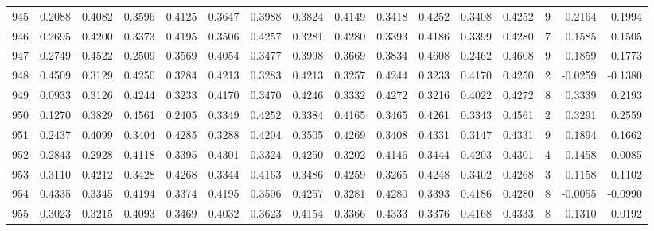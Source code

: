 \begin{tabular}{lrrrrrrrrrrrrrrr}
945 &      0.2088 &  0.4082 &  0.3596 &  0.4125 &  0.3647 &  0.3988 &  0.3824 &  0.4149 &  0.3418 &  0.4252 &   0.3408 &     0.4252 &      9 &                    0.2164 &                     0.1994 \\
946 &      0.2695 &  0.4200 &  0.3373 &  0.4195 &  0.3506 &  0.4257 &  0.3281 &  0.4280 &  0.3393 &  0.4186 &   0.3399 &     0.4280 &      7 &                    0.1585 &                     0.1505 \\
947 &      0.2749 &  0.4522 &  0.2509 &  0.3569 &  0.4054 &  0.3477 &  0.3998 &  0.3669 &  0.3834 &  0.4608 &   0.2462 &     0.4608 &      9 &                    0.1859 &                     0.1773 \\
948 &      0.4509 &  0.3129 &  0.4250 &  0.3284 &  0.4213 &  0.3283 &  0.4213 &  0.3257 &  0.4244 &  0.3233 &   0.4170 &     0.4250 &      2 &                   -0.0259 &                    -0.1380 \\
949 &      0.0933 &  0.3126 &  0.4244 &  0.3233 &  0.4170 &  0.3470 &  0.4246 &  0.3332 &  0.4272 &  0.3216 &   0.4022 &     0.4272 &      8 &                    0.3339 &                     0.2193 \\
950 &      0.1270 &  0.3829 &  0.4561 &  0.2405 &  0.3349 &  0.4252 &  0.3384 &  0.4165 &  0.3465 &  0.4261 &   0.3343 &     0.4561 &      2 &                    0.3291 &                     0.2559 \\
951 &      0.2437 &  0.4099 &  0.3404 &  0.4285 &  0.3288 &  0.4204 &  0.3505 &  0.4269 &  0.3408 &  0.4331 &   0.3147 &     0.4331 &      9 &                    0.1894 &                     0.1662 \\
952 &      0.2843 &  0.2928 &  0.4118 &  0.3395 &  0.4301 &  0.3324 &  0.4250 &  0.3202 &  0.4146 &  0.3444 &   0.4203 &     0.4301 &      4 &                    0.1458 &                     0.0085 \\
953 &      0.3110 &  0.4212 &  0.3428 &  0.4268 &  0.3344 &  0.4163 &  0.3486 &  0.4259 &  0.3265 &  0.4248 &   0.3402 &     0.4268 &      3 &                    0.1158 &                     0.1102 \\
954 &      0.4335 &  0.3345 &  0.4194 &  0.3374 &  0.4195 &  0.3506 &  0.4257 &  0.3281 &  0.4280 &  0.3393 &   0.4186 &     0.4280 &      8 &                   -0.0055 &                    -0.0990 \\
955 &      0.3023 &  0.3215 &  0.4093 &  0.3469 &  0.4032 &  0.3623 &  0.4154 &  0.3366 &  0.4333 &  0.3376 &   0.4168 &     0.4333 &      8 &                    0.1310 &                     0.0192 \\

\end{tabular}
